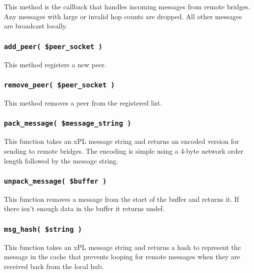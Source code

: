 \documentclass[12pt,a4paper]{article}
\begin{document}
This method is the callback that handles incoming messages from remote
bridges.  Any messages with large or invalid hop counts are dropped.
All other messages are broadcast locally.

\subsubsection*{\texttt{add\_peer( \$peer\_socket )}\label{xPL::Bridge_add_peer_peer_socket_}}


This method registers a new peer.

\subsubsection*{\texttt{remove\_peer( \$peer\_socket )}\label{xPL::Bridge_remove_peer_peer_socket_}}


This method removes a peer from the registered list.

\subsubsection*{\texttt{pack\_message( \$message\_string )}\label{xPL::Bridge_pack_message_message_string_}}


This function takes an xPL message string and returns an encoded
version for sending to remote bridges.  The encoding is simple using a
4-byte network order length followed by the message string.

\subsubsection*{\texttt{unpack\_message( \$buffer )}\label{xPL::Bridge_unpack_message_buffer_}}


This function removes a message from the start of the buffer and
returns it.  If there isn't enough data in the buffer it returns
undef.

\subsubsection*{\texttt{msg\_hash( \$string )}\label{xPL::Bridge_msg_hash_string_}}


This function takes an xPL message string and returns a hash to
represent the message in the cache that prevents looping for remote
messages when they are received back from the local hub.
\end{document}
